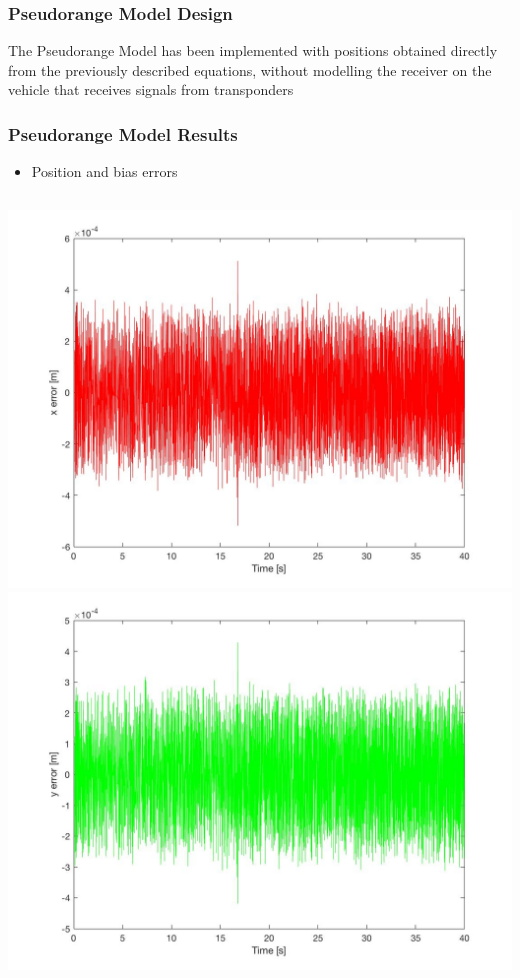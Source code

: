 \documentclass{beamer}
\begin{document}
    
    \begin{frame}
        \frametitle{Pseudorange Model Design}
        The Pseudorange Model has been implemented 
        with positions obtained directly from the 
        previously described equations,
        without modelling the receiver on the vehicle that
        receives signals from transponders
    \end{frame}





	\begin{frame}
		\frametitle{Pseudorange Model Results}
		\begin{itemize}
		       \item Position and bias errors
		\end{itemize}
		\begin{columns}
			\includegraphics[scale= 0.1]{x_error.jpg}\\
			\includegraphics[scale=0.1]{y_error.jpg}

\end{columns}
\end{frame}
\end{document}
